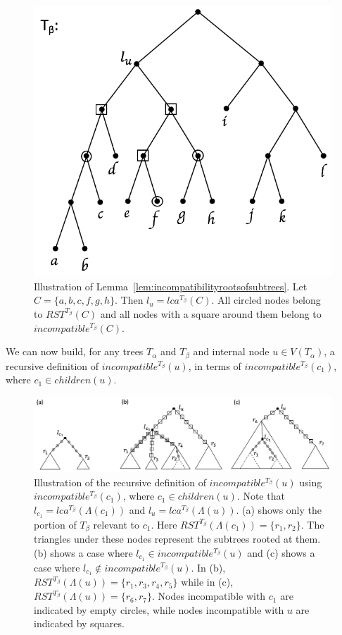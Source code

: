 \documentclass{article}
\newcommand{\leafset}{\Lambda}
\newcommand{\TA}{T_\alpha}
\newcommand{\TB}{T_\beta}
\begin{document}
    \begin{figure}[h]
        \includegraphics[scale=0.5]{rootsofsubtrees}
        \centering
        \caption{Illustration of Lemma~\ref{lem:incompatibilityrootsofsubtrees}. Let $C = \{a, b, c, f, g, h\}$. Then $l_u = lca^{\TB}(C)$. All circled nodes belong to $RST^{\TB}(C)$ and all nodes with a square around them belong to $incompatible^{\TB}(C)$.}
        \label{fig:rootsofsubtrees}
    \end{figure}

    We can now build, for any trees $\TA$ and $\TB$ and internal node $u \in V(\TA)$, a recursive definition of $incompatible^{\TB}(u)$, in terms of $incompatible^{\TB}(c_1)$, where $c_1 \in children(u)$.

    \begin{figure}[h]
        \includegraphics[scale=0.5]{incompatibilityrecursive}
        \centering
        \caption{Illustration of the recursive definition of $incompatible^{\TB}(u)$ using $incompatible^{\TB}(c_1)$, where $c_1 \in children(u)$. Note that $l_{c_1} = lca^{\TB}(\leafset(c_1))$ and $l_u = lca^{\TB}(\leafset(u))$. (a) shows only the portion of $\TB$ relevant to $c_1$. Here $RST^{\TB}(\leafset(c_1)) = \{r_1, r_2\}$. The triangles under these nodes represent the subtrees rooted at them. (b) shows a case where $l_{c_1} \in incompatible^{\TB}(u)$ and (c) shows a case where $l_{c_1} \not\in incompatible^{\TB}(u)$. In (b), $RST^{\TB}(\leafset(u)) = \{r_1, r_3, r_4, r_5\}$ while in (c), $RST^{\TB}(\leafset(u)) = \{r_6, r_7\}$. Nodes incompatible with $c_1$ are indicated by empty circles, while nodes incompatible with $u$ are indicated by squares.}
        \label{fig:incompatibilityrecursive}
    \end{figure}
\end{document}
